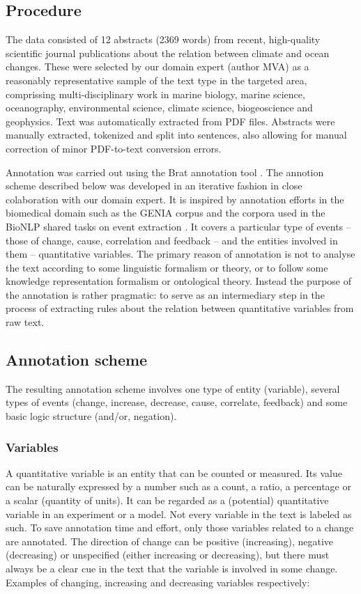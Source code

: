 \documentclass[10pt, a4paper]{article}
\begin{document}
\subsection{Procedure}

The data consisted of 12 abstracts (2369 words) from recent, high-quality scientific journal publications about the relation between climate and ocean changes. 
These were selected by our domain expert (author MVA) as a reasonably representative sample of the text type in the targeted area, comprissing multi-disciplinary work in marine biology, marine science, oceanography, environmental science, climate science, biogeoscience and geophysics.
Text was automatically extracted from PDF files.
Abstracts were manually extracted, tokenized and split into sentences, also allowing for manual correction of minor PDF-to-text conversion errors.

Annotation was carried out using the Brat annotation tool \cite{stenetorp2012}.
The annotion scheme described below was developed in an iterative fashion in close colaboration with our domain expert.
It is inspired by annotation efforts in the biomedical domain such as the GENIA corpus \cite{Kim2003GENIA} and the corpora used in the BioNLP shared tasks on event extraction \cite{Kim2009Overview}.
It covers a particular type of events -- those of change, cause, correlation and feedback -- and the entities involved in them -- quantitative variables.
The primary reason of annotation is not to analyse the text according to some linguistic formalism or theory, or to follow some knowledge representation formalism or ontological theory.
Instead the purpose of the annotation is rather pragmatic: to serve as an intermediary step in the process of extracting rules about the relation between quantitative variables from raw text.      
 
\subsection{Annotation scheme}

The resulting annotation scheme involves one type of entity (variable), several types of events (change, increase, decrease, cause, correlate, feedback) and some basic logic structure (and/or, negation).  


\subsubsection{Variables}

A quantitative variable is an entity that can be counted or measured.
Its value can be naturally expressed by a number such as a count, a ratio, a percentage or a scalar (quantity of units).
It can be regarded as a (potential) quantitative variable in an experiment or a model. 
Not every variable in the text is labeled as such.
To save annotation time and effort, only those variables related to a change are annotated.
The  direction of change can be positive (increasing), negative (decreasing) or unspecified (either increasing or decreasing), but there must always be a clear cue in the text that the variable is involved in some change. 
Examples of changing, increasing and decreasing variables respectively:
\end{document}
